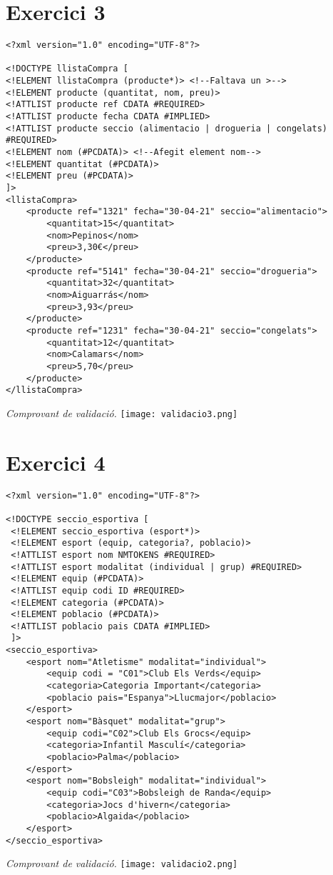 \documentclass{article}
\begin{document}
\newpage

\section{Exercici 3}

\begin{verbatim}
<?xml version="1.0" encoding="UTF-8"?>

<!DOCTYPE llistaCompra [
<!ELEMENT llistaCompra (producte*)> <!--Faltava un >-->
<!ELEMENT producte (quantitat, nom, preu)>
<!ATTLIST producte ref CDATA #REQUIRED>
<!ATTLIST producte fecha CDATA #IMPLIED> 
<!ATTLIST producte seccio (alimentacio | drogueria | congelats) #REQUIRED>
<!ELEMENT nom (#PCDATA)> <!--Afegit element nom-->
<!ELEMENT quantitat (#PCDATA)>
<!ELEMENT preu (#PCDATA)>
]>
<llistaCompra>
    <producte ref="1321" fecha="30-04-21" seccio="alimentacio">
        <quantitat>15</quantitat>
        <nom>Pepinos</nom>
        <preu>3,30€</preu>
    </producte>
    <producte ref="5141" fecha="30-04-21" seccio="drogueria">
        <quantitat>32</quantitat>
        <nom>Aiguarrás</nom>
        <preu>3,93</preu>
    </producte>
    <producte ref="1231" fecha="30-04-21" seccio="congelats">
        <quantitat>12</quantitat>
        <nom>Calamars</nom>
        <preu>5,70</preu>
    </producte>
</llistaCompra>
\end{verbatim}
\vspace{,5cm}
\begin{center}
    \textit{Comprovant de validació.}
    \texttt{[image: validacio3.png]}
\end{center}

\section{Exercici 4}

\begin{verbatim}
<?xml version="1.0" encoding="UTF-8"?>

<!DOCTYPE seccio_esportiva [
 <!ELEMENT seccio_esportiva (esport*)>
 <!ELEMENT esport (equip, categoria?, poblacio)>
 <!ATTLIST esport nom NMTOKENS #REQUIRED>
 <!ATTLIST esport modalitat (individual | grup) #REQUIRED>
 <!ELEMENT equip (#PCDATA)>
 <!ATTLIST equip codi ID #REQUIRED>
 <!ELEMENT categoria (#PCDATA)>
 <!ELEMENT poblacio (#PCDATA)>
 <!ATTLIST poblacio pais CDATA #IMPLIED>
 ]>
<seccio_esportiva>
    <esport nom="Atletisme" modalitat="individual">
        <equip codi = "C01">Club Els Verds</equip>
        <categoria>Categoria Important</categoria>
        <poblacio pais="Espanya">Llucmajor</poblacio>
    </esport>
    <esport nom="Bàsquet" modalitat="grup">
        <equip codi="C02">Club Els Grocs</equip>
        <categoria>Infantil Masculí</categoria>
        <poblacio>Palma</poblacio>
    </esport>
    <esport nom="Bobsleigh" modalitat="individual">
        <equip codi="C03">Bobsleigh de Randa</equip>
        <categoria>Jocs d'hivern</categoria>
        <poblacio>Algaida</poblacio>
    </esport>
</seccio_esportiva>
\end{verbatim}
\vspace{0cm}
\begin{center}
    \textit{Comprovant de validació.}
    \texttt{[image: validacio2.png]}
\end{center}
\end{document}

